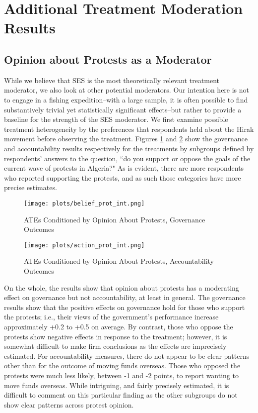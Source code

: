 \documentclass[12pt, letterpaper]{article}
\begin{document}
\section{Additional Treatment Moderation Results}

\subsection*{Opinion about Protests as a Moderator}

While we believe that SES is the most theoretically relevant treatment moderator, we also look at other potential moderators. Our intention here is not to engage in a fishing expedition--with a large sample, it is often possible to find substantively trivial yet statistically significant effects--but rather to provide a baseline for the strength of the SES moderator. We first examine possible treatment heterogeneity by the preferences that respondents held about the Hirak movement before observing the treatment. Figures \ref{fig:beliefprot} and \ref{fig:actionprot} show the governance and accountability results respectively for the treatments by subgroups defined by respondents' answers to the question, ``do you support or oppose the goals of the current wave of protests in Algeria?" As is evident, there are more respondents who reported supporting the  protests, and as such those categories have more precise estimates. 

\begin{figure}
    \centering
    \texttt{[image: plots/belief\_prot\_int.png]}
    \caption{ATEs Conditioned by Opinion About Protests, Governance Outcomes}
    \label{fig:beliefprot}
\end{figure}

\begin{figure}
    \centering
    \texttt{[image: plots/action\_prot\_int.png]}
    \caption{ATEs Conditioned by Opinion About Protests, Accountability Outcomes}
    \label{fig:actionprot}
\end{figure}

On the whole, the results show that opinion about protests has a moderating effect on governance but not accountability, at least in general. The governance results show that the positive effects on governance hold for those who support the protests; i.e., their views of the government's performance increase approximately +0.2 to +0.5 on average. By contrast, those who oppose the protests show negative effects in response to the treatment; however, it is somewhat difficult to make firm conclusions as the effects are imprecisely estimated. For accountability measures, there do not appear to be clear patterns other than for the outcome of moving funds overseas. Those who opposed the protests were much less likely, between -1 and -2 points, to report wanting to move funds overseas. While intriguing, and fairly precisely estimated, it is difficult to comment on this particular finding as the other subgroups do not show clear patterns across protest opinion.
\end{document}

